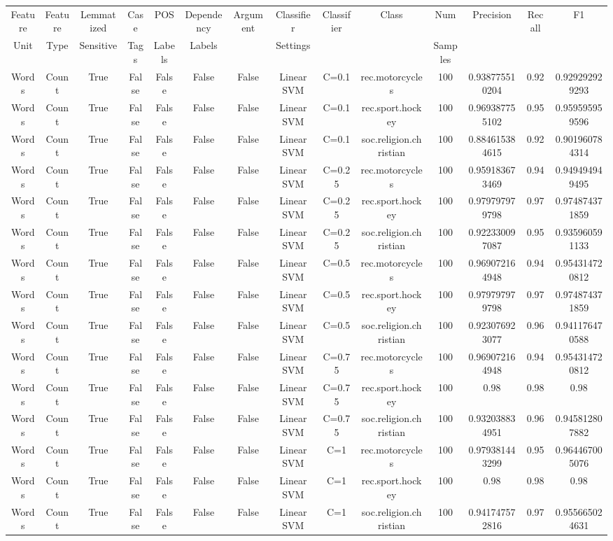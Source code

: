 \documentclass{article}
\begin{document}
  \begin{tabular}{|c|c|c|c|c|c|c|c|c|c|c|c|c|c|}
  \hline
  Feature  & Feature  & Lemmatized & Case  &  POS  &  Dependency  &  Argument  & Classifier & Classifier  & Class & Num & Precision & Recall & F1 \\
  Unit & Type & Sensitive & Tags &  Labels &  Labels & & Settings & &  & Samples & & &  \\
  \hline
Words & Count & True & False & False & False & False & Linear SVM & C=0.1 & rec.motorcycles & 100 & 0.938775510204 & 0.92 & 0.929292929293 \\ 
Words & Count & True & False & False & False & False & Linear SVM & C=0.1 & rec.sport.hockey & 100 & 0.969387755102 & 0.95 & 0.959595959596 \\ 
Words & Count & True & False & False & False & False & Linear SVM & C=0.1 & soc.religion.christian & 100 & 0.884615384615 & 0.92 & 0.901960784314 \\ 
Words & Count & True & False & False & False & False & Linear SVM & C=0.25 & rec.motorcycles & 100 & 0.959183673469 & 0.94 & 0.949494949495 \\ 
Words & Count & True & False & False & False & False & Linear SVM & C=0.25 & rec.sport.hockey & 100 & 0.979797979798 & 0.97 & 0.974874371859 \\ 
Words & Count & True & False & False & False & False & Linear SVM & C=0.25 & soc.religion.christian & 100 & 0.922330097087 & 0.95 & 0.935960591133 \\ 
Words & Count & True & False & False & False & False & Linear SVM & C=0.5 & rec.motorcycles & 100 & 0.969072164948 & 0.94 & 0.954314720812 \\ 
Words & Count & True & False & False & False & False & Linear SVM & C=0.5 & rec.sport.hockey & 100 & 0.979797979798 & 0.97 & 0.974874371859 \\ 
Words & Count & True & False & False & False & False & Linear SVM & C=0.5 & soc.religion.christian & 100 & 0.923076923077 & 0.96 & 0.941176470588 \\ 
Words & Count & True & False & False & False & False & Linear SVM & C=0.75 & rec.motorcycles & 100 & 0.969072164948 & 0.94 & 0.954314720812 \\ 
Words & Count & True & False & False & False & False & Linear SVM & C=0.75 & rec.sport.hockey & 100 & 0.98 & 0.98 & 0.98 \\ 
Words & Count & True & False & False & False & False & Linear SVM & C=0.75 & soc.religion.christian & 100 & 0.932038834951 & 0.96 & 0.945812807882 \\ 
Words & Count & True & False & False & False & False & Linear SVM & C=1 & rec.motorcycles & 100 & 0.979381443299 & 0.95 & 0.964467005076 \\ 
Words & Count & True & False & False & False & False & Linear SVM & C=1 & rec.sport.hockey & 100 & 0.98 & 0.98 & 0.98 \\ 
Words & Count & True & False & False & False & False & Linear SVM & C=1 & soc.religion.christian & 100 & 0.941747572816 & 0.97 & 0.955665024631 \\ 
\hline
  \end{tabular}
  
  
  
  
\end{document}
